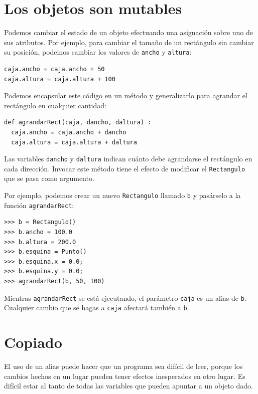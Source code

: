 \section{Los objetos son mutables}

Podemos cambiar el estado de un objeto efectuando una asignación
sobre uno de sus atributos. Por ejemplo, para cambiar el tamaño de
un rectángulo sin cambiar su posición, podemos cambiar los valores de
\texttt{ancho} y \texttt{altura}:

\beforeverb
\begin{verbatim}
caja.ancho = caja.ancho + 50
caja.altura = caja.altura + 100
\end{verbatim}
\afterverb
%
Podemos encapsular este código en un método y generalizarlo
para agrandar el rectángulo en cualquier cantidad:


\beforeverb
\begin{verbatim}
def agrandarRect(caja, dancho, daltura) :
  caja.ancho = caja.ancho + dancho
  caja.altura = caja.altura + daltura
\end{verbatim}
\afterverb
%
Las variables \texttt{dancho} y \texttt{daltura} indican cuánto debe agrandarse
el rectángulo en cada dirección. Invocar este método tiene el efecto de
modificar el \texttt{Rectangulo} que se pasa como argumento.

Por ejemplo, podemos crear un nuevo \texttt{Rectangulo} llamado \texttt{b}
y pasárselo a la función \texttt{agrandarRect}:

\beforeverb
\begin{verbatim}
>>> b = Rectangulo()
>>> b.ancho = 100.0
>>> b.altura = 200.0
>>> b.esquina = Punto()
>>> b.esquina.x = 0.0;
>>> b.esquina.y = 0.0;
>>> agrandarRect(b, 50, 100)
\end{verbatim}
\afterverb
%
Mientras \texttt{agrandarRect} se está ejecutando, el parámetro \texttt{caja} es un
alias de \texttt{b}. Cualquier cambio que se hagas a \texttt{caja} afectará también a
\texttt{b}.


\section{Copiado}

El uso de un alias puede hacer que un programa sea difícil de leer,
porque los cambios hechos en un lugar pueden tener efectos inesperados
en otro lugar. Es difícil estar al tanto de todas las variables que 
pueden apuntar a un objeto dado.

